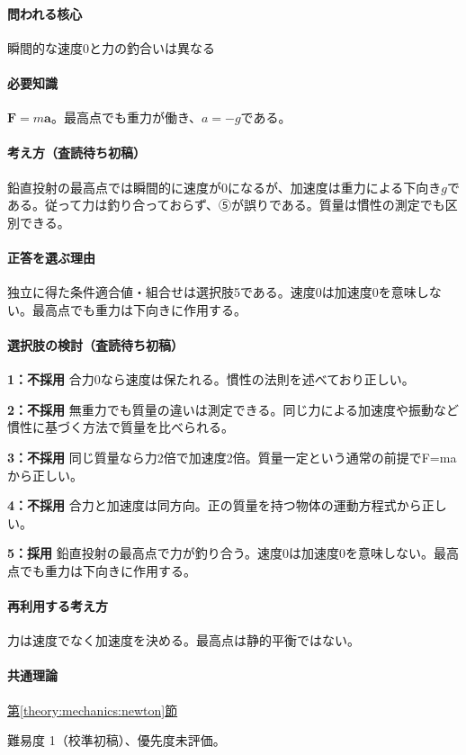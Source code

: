 \paragraph{問われる核心} 瞬間的な速度0と力の釣合いは異なる

\paragraph{必要知識} \(\mathbf F=m\mathbf a\)。最高点でも重力が働き、\(a=-g\)である。

\paragraph{考え方（査読待ち初稿）} 鉛直投射の最高点では瞬間的に速度が0になるが、加速度は重力による下向き\(g\)である。従って力は釣り合っておらず、⑤が誤りである。質量は慣性の測定でも区別できる。

\paragraph{正答を選ぶ理由} 独立に得た条件適合値・組合せは選択肢5である。速度0は加速度0を意味しない。最高点でも重力は下向きに作用する。

\paragraph{選択肢の検討（査読待ち初稿）}

\noindent\textbf{1：不採用} 合力0なら速度は保たれる。慣性の法則を述べており正しい。\par

\noindent\textbf{2：不採用} 無重力でも質量の違いは測定できる。同じ力による加速度や振動など慣性に基づく方法で質量を比べられる。\par

\noindent\textbf{3：不採用} 同じ質量なら力2倍で加速度2倍。質量一定という通常の前提でF=maから正しい。\par

\noindent\textbf{4：不採用} 合力と加速度は同方向。正の質量を持つ物体の運動方程式から正しい。\par

\noindent\textbf{5：採用} 鉛直投射の最高点で力が釣り合う。速度0は加速度0を意味しない。最高点でも重力は下向きに作用する。\par

\paragraph{再利用する考え方} 力は速度でなく加速度を決める。最高点は静的平衡ではない。

\paragraph{共通理論} \hyperref[theory:mechanics:newton]{第\ref*{theory:mechanics:newton}節}

\par 難易度 1（校準初稿）、優先度未評価。
